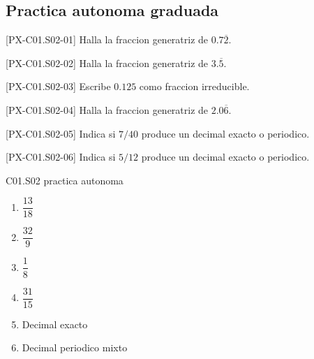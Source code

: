 \subsection*{Practica autonoma graduada}
\begin{exercise}{[PX-C01.S02-01] Halla la fraccion generatriz de \(0.7\overline{2}\).}
\end{exercise}
\begin{exercise}{[PX-C01.S02-02] Halla la fraccion generatriz de \(3.\overline{5}\).}
\end{exercise}
\begin{exercise}{[PX-C01.S02-03] Escribe \(0.125\) como fraccion irreducible.}
\end{exercise}
\begin{exercise}{[PX-C01.S02-04] Halla la fraccion generatriz de \(2.0\overline{6}\).}
\end{exercise}
\begin{exercise}{[PX-C01.S02-05] Indica si \(7/40\) produce un decimal exacto o periodico.}
\end{exercise}
\begin{exercise}{[PX-C01.S02-06] Indica si \(5/12\) produce un decimal exacto o periodico.}
\end{exercise}

\begin{shortanswer}{C01.S02 practica autonoma}
\begin{enumerate}[label=\textbf{PX-C01.S02-\arabic*:}, leftmargin=*]
  \item \(\dfrac{13}{18}\)
  \item \(\dfrac{32}{9}\)
  \item \(\dfrac{1}{8}\)
  \item \(\dfrac{31}{15}\)
  \item Decimal exacto
  \item Decimal periodico mixto
\end{enumerate}
\end{shortanswer}

